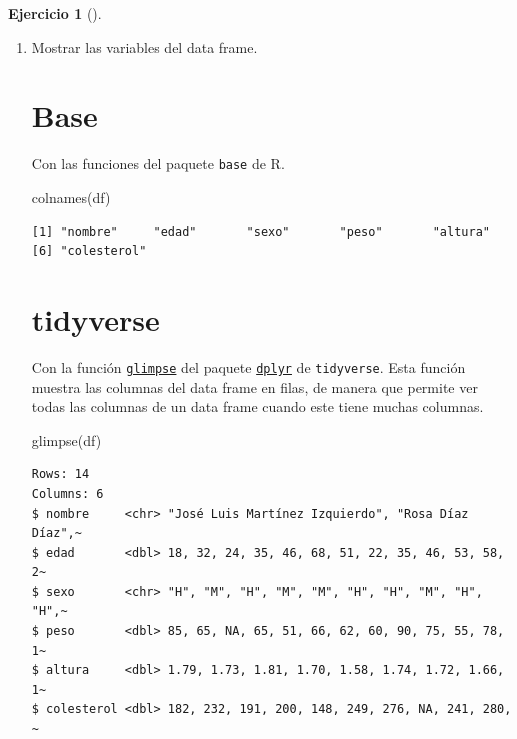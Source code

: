 \documentclass[
  spanish,
  a4paper,
]{scrreport}
\newenvironment{Shaded}{\begin{snugshade}}{\end{snugshade}}
\newcommand{\FunctionTok}[1]{\textcolor[rgb]{0.28,0.35,0.67}{#1}}
\newcommand{\NormalTok}[1]{\textcolor[rgb]{0.00,0.23,0.31}{#1}}
\theoremstyle{definition}
\newtheorem{exercise}{Ejercicio}[chapter]
\theoremstyle{remark}
\begin{document}
\begin{exercise}[]
\begin{enumerate}
\begin{tcolorbox}
  \end{tcolorbox}
\item
  Mostrar las variables del data frame.

  \begin{tcolorbox}[enhanced jigsaw, titlerule=0mm, arc=.35mm, rightrule=.15mm, opacitybacktitle=0.6, leftrule=.75mm, colframe=quarto-callout-tip-color-frame, toptitle=1mm, breakable, colbacktitle=quarto-callout-tip-color!10!white, bottomrule=.15mm, colback=white, left=2mm, bottomtitle=1mm, opacityback=0, title=\textcolor{quarto-callout-tip-color}{\faLightbulb}\hspace{0.5em}{Solución}, toprule=.15mm, coltitle=black]

  \section{Base}

  Con las funciones del paquete \texttt{base} de R.

\begin{Shaded}
\begin{Highlighting}[]
\FunctionTok{colnames}\NormalTok{(df)}
\end{Highlighting}
\end{Shaded}

\begin{verbatim}
[1] "nombre"     "edad"       "sexo"       "peso"       "altura"    
[6] "colesterol"
\end{verbatim}

  \section{tidyverse}

  Con la función
  \href{https://dplyr.tidyverse.org/reference/glimpse.html?q=read_csv\#undefined}{\texttt{glimpse}}
  del paquete
  \href{https://dplyr.tidyverse.org/index.html}{\texttt{dplyr}} de
  \texttt{tidyverse}. Esta función muestra las columnas del data frame
  en filas, de manera que permite ver todas las columnas de un data
  frame cuando este tiene muchas columnas.

\begin{Shaded}
\begin{Highlighting}[]
\FunctionTok{glimpse}\NormalTok{(df)}
\end{Highlighting}
\end{Shaded}

\begin{verbatim}
Rows: 14
Columns: 6
$ nombre     <chr> "José Luis Martínez Izquierdo", "Rosa Díaz Díaz",~
$ edad       <dbl> 18, 32, 24, 35, 46, 68, 51, 22, 35, 46, 53, 58, 2~
$ sexo       <chr> "H", "M", "H", "M", "M", "H", "H", "M", "H", "H",~
$ peso       <dbl> 85, 65, NA, 65, 51, 66, 62, 60, 90, 75, 55, 78, 1~
$ altura     <dbl> 1.79, 1.73, 1.81, 1.70, 1.58, 1.74, 1.72, 1.66, 1~
$ colesterol <dbl> 182, 232, 191, 200, 148, 249, 276, NA, 241, 280, ~
\end{verbatim}


\end{tcolorbox}
\end{enumerate}
\end{exercise}
\end{document}
